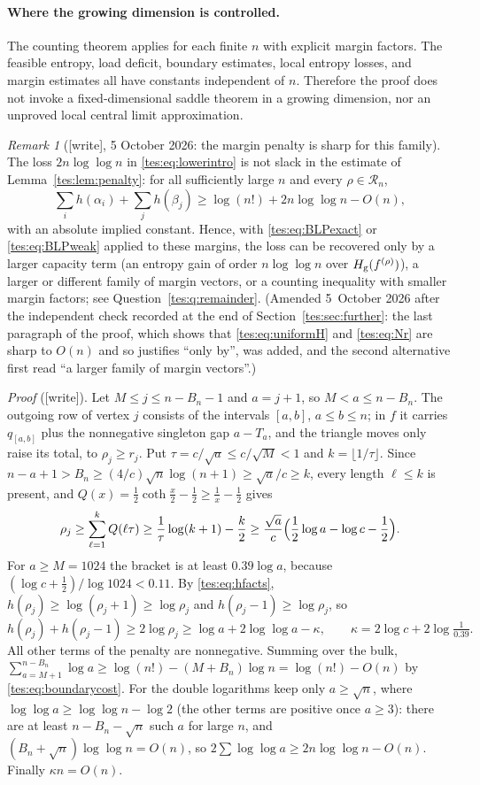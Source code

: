 \documentclass[11pt,a4paper]{article}
\theoremstyle{remark}\newtheorem{remark}[theorem]{Remark}
\newcommand{\Hg}{H_{\rm g}}\newcommand{\floor}[1]{\left\lfloor#1\right\rfloor}
\numberwithin{equation}{section}
\begin{document}
\paragraph{Where the growing dimension is controlled.}
The counting theorem applies for each finite $n$ with explicit margin factors. The feasible entropy, load deficit, boundary estimates, local entropy losses, and margin estimates all have constants independent of $n$. Therefore the proof does not invoke a fixed-dimensional saddle theorem in a growing dimension, nor an unproved local central limit approximation.

\begin{remark}[{[write]}, 5 October 2026: the margin penalty is sharp for this family]\label{tes:rem:penaltysharp}
The loss $2n\log\log n$ in \eqref{tes:eq:lowerintro} is not slack in the
estimate of Lemma~\ref{tes:lem:penalty}: for all sufficiently large $n$
and every $\rho\in\mathcal R_n$,
\[
\sum_ih(\alpha_i)+\sum_jh(\beta_j)\ge\log(n!)+2n\log\log n-O(n),
\]
with an absolute implied constant. Hence, with \eqref{tes:eq:BLPexact} or
\eqref{tes:eq:BLPweak} applied to these margins, the loss can be recovered
only by a larger capacity term (an entropy gain of order $n\log\log n$ over
$\Hg(f^{(\rho)})$), a larger or different family of margin vectors, or a
counting inequality with smaller margin factors; see
Question~\ref{tes:q:remainder}. (Amended 5~October 2026 after the
independent check recorded at the end of Section~\ref{tes:sec:further}:
the last paragraph of the proof, which shows that \eqref{tes:eq:uniformH}
and \eqref{tes:eq:Nr} are sharp to $O(n)$ and so justifies ``only by'',
was added, and the second alternative first read ``a larger family of
margin vectors''.)

\emph{Proof} ([write]). Let $M\le j\le n-B_n-1$ and $a=j+1$, so
$M<a\le n-B_n$. The outgoing row of vertex $j$ consists of the intervals
$[a,b]$, $a\le b\le n$; in $f$ it carries $q_{[a,b]}$ plus the
nonnegative singleton gap $a-T_a$, and the triangle moves only raise its
total, to $\rho_j\ge r_j$. Put $\tau=c/\sqrt a\le c/\sqrt M<1$ and
$k=\lfloor1/\tau\rfloor$. Since
$n-a+1>B_n\ge(4/c)\sqrt n\log(n+1)\ge\sqrt a/c\ge k$, every length
$\ell\le k$ is present, and $Q(x)=\frac12\coth\frac x2-\frac12\ge
\frac1x-\frac12$ gives
\[
\rho_j\ge\sum_{\ell=1}^{k}Q(\ell\tau)\ge\frac1\tau\log(k+1)-\frac k2
\ge\frac{\sqrt a}{c}\Bigl(\frac12\log a-\log c-\frac12\Bigr).
\]
For $a\ge M=1024$ the bracket is at least $0.39\log a$, because
$(\log c+\frac12)/\log1024<0.11$. By \eqref{tes:eq:hfacts},
$h(\rho_j)\ge\log(\rho_j+1)\ge\log\rho_j$ and $h(\rho_j-1)\ge\log\rho_j$,
so
\[
h(\rho_j)+h(\rho_j-1)\ge2\log\rho_j\ge\log a+2\log\log a-\kappa,
\qquad\kappa=2\log c+2\log\tfrac1{0.39}.
\]
All other terms of the penalty are nonnegative. Summing over the bulk,
$\sum_{a=M+1}^{n-B_n}\log a\ge\log(n!)-(M+B_n)\log n=\log(n!)-O(n)$ by
\eqref{tes:eq:boundarycost}. For the double logarithms keep only
$a\ge\sqrt n$, where $\log\log a\ge\log\log n-\log2$ (the other terms are
positive once $a\ge3$): there are at least $n-B_n-\sqrt n$ such $a$ for
large $n$, and $(B_n+\sqrt n)\log\log n=O(n)$, so
$2\sum\log\log a\ge2n\log\log n-O(n)$. Finally $\kappa n=O(n)$.


\end{remark}
\end{document}
